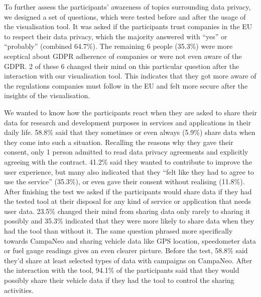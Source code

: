 \documentclass[../paper.tex]{subfiles}
\begin{document}
  To further assess the participants' awareness of topics surrounding data
  privacy, we designed a set of questions, which were tested before and after
  the usage of the visualisation tool. It was asked if the participants trust
  companies in the EU to respect their data privacy, which the majority answered
  with ``yes'' or ``probably'' (combined 64.7\%).
  The remaining 6 people (35.3\%) were more sceptical about GDPR adherence of companies or were not even aware of the GDPR.
  2 of these 6 changed their mind on this particular question after the interaction with our visualisation tool.
  This indicates that they got more aware of the regulations companies must follow in the EU and felt more secure after the insights of the visualisation.

  We wanted to know how the participants react when they are asked to share their data for research and development purposes in services and applications in their daily life.
  58.8\% said that they sometimes or even always (5.9\%) share data when they come into such a situation.
  Recalling the reasons why they gave their consent, only 1 person admitted to read data privacy agreements and explicitly agreeing with the contract.
  41.2\% said they wanted to contribute to improve the user experience, but many also indicated that they ``felt like they had to agree to use the service'' (35.3\%), or even gave their consent without realising (11.8\%).
  After finishing the test we asked if the participants would share data if they had the tested tool at their disposal for any kind of service or application that needs user data.
  23.5\% changed their mind from sharing data only rarely to sharing it possibly and 35.3\% indicated that they were more likely to share data when they had the tool than without it.
  The same question phrased more specifically towards CampaNeo and sharing vehicle data like GPS location, speedometer data or fuel gauge readings gives an even clearer picture.
  Before the test, 58.8\% said they'd share at least selected types of data with campaigns on CampaNeo. After the interaction with the tool, 94.1\% of the participants said that they would possibly share their vehicle data if they had the tool to control the sharing activities.
\end{document}
